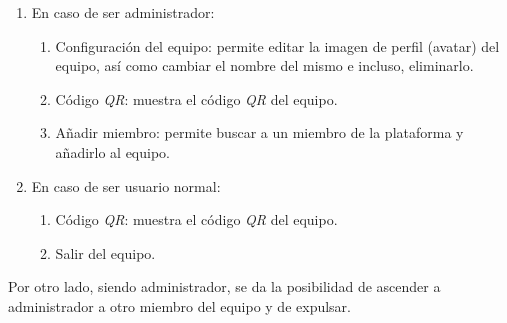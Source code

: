 \documentclass[twoside]{report}
\begin{document}
\begin{enumerate}
	\item En caso de ser administrador:
	\begin{enumerate}
		\item Configuración del equipo: permite editar la imagen de perfil (avatar) del equipo, así como cambiar el nombre del mismo e incluso, eliminarlo.
		\item Código \textit{QR}: muestra el código \textit{QR} del equipo.
		\item Añadir miembro: permite buscar a un miembro de la plataforma y añadirlo al equipo.
	\end{enumerate}
	\item En caso de ser usuario normal:
	\begin{enumerate}
		\item Código \textit{QR}: muestra el código \textit{QR} del equipo.
		\item Salir del equipo.
	\end{enumerate}
\end{enumerate}
Por otro lado, siendo administrador, se da la posibilidad de ascender a administrador a otro miembro del equipo y de expulsar.
\end{document}
